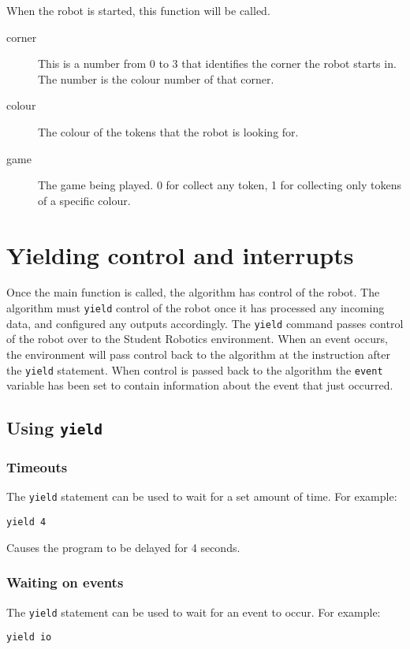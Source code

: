 \documentclass{article}
\begin{document}
When the robot is started, this function will be called.
\begin{description}
\item[corner]This is a number from 0 to 3 that identifies the corner the robot
starts in.  The number is the colour number of that corner.
\item[colour]The colour of the tokens that the robot is looking for.
\item[game]The game being played. 0 for collect any token, 1 for collecting
only tokens of a specific colour.
\end{description}
\section{Yielding control and interrupts}
Once the main function is called, the algorithm has control of the robot.  The
algorithm must \texttt{yield} control of the robot once it has
processed any incoming data, and configured any outputs accordingly.
The \texttt{yield} command passes control of the robot over to the
Student Robotics environment. When an event occurs, the environment will pass
control back to the algorithm at the instruction after the \texttt{yield}
statement.  When control is passed back to the
algorithm the \texttt{event} variable has been set to contain information
about the event that just occurred.

\subsection{Using \texttt{yield}}
\subsubsection{Timeouts}
The \texttt{yield} statement can be used to wait for a set amount of
time.  For example:

\begin{verbatim}
yield 4
\end{verbatim}

Causes the program to be delayed for 4 seconds.

\subsubsection{Waiting on events}
The \texttt{yield} statement can be used to wait for an event to
occur.  For example:

\begin{verbatim}
yield io
\end{verbatim}
\end{document}
